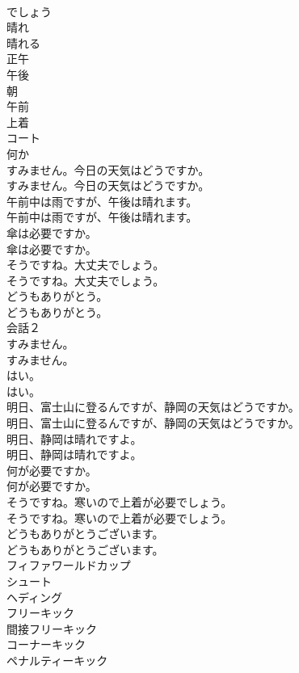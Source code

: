 \documentclass[8pt]{extreport}
\begin{document}
\begin{CJK}{UTF8}{min}
\\	でしょう
\\	晴れ
\\	晴れる
\\	正午
\\	午後
\\	朝
\\	午前
\\	上着
\\	コート
\\	何か
\\	すみません。今日の天気はどうですか。	
\\	すみません。今日の天気はどうですか。 
\\	午前中は雨ですが、午後は晴れます。	
\\	午前中は雨ですが、午後は晴れます。 
\\	傘は必要ですか。	
\\	傘は必要ですか。 
\\	そうですね。大丈夫でしょう。	
\\	そうですね。大丈夫でしょう。 
\\	どうもありがとう。	
\\	どうもありがとう。 
\\	会話２	
\\	すみません。	
\\	すみません。 
\\	はい。	
\\	はい。 
\\	明日、富士山に登るんですが、静岡の天気はどうですか。	
\\	明日、富士山に登るんですが、静岡の天気はどうですか。 
\\	明日、静岡は晴れですよ。	
\\	明日、静岡は晴れですよ。 
\\	何が必要ですか。	
\\	何が必要ですか。 
\\	そうですね。寒いので上着が必要でしょう。	
\\	そうですね。寒いので上着が必要でしょう。 
\\	どうもありがとうございます。	
\\	どうもありがとうございます。 
\\	フィファワールドカップ
\\	シュート
\\	ヘディング
\\	フリーキック
\\	間接フリーキック
\\	コーナーキック
\\	ペナルティーキック

\end{CJK}
\end{document}
